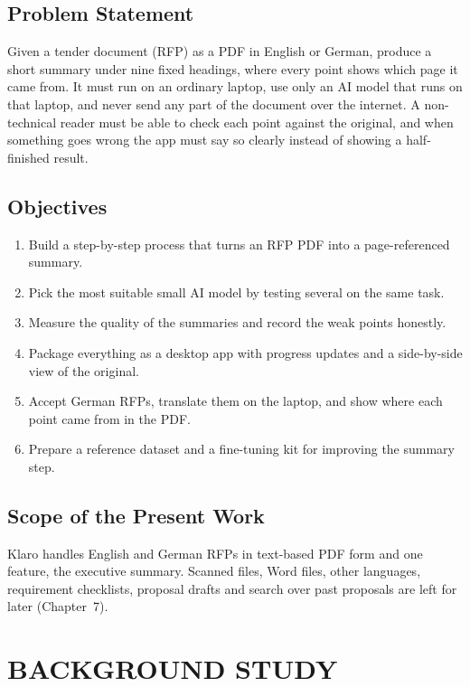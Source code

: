 \documentclass[11pt,a4paper,oneside]{report}
\newcommand{\nonum}{}%
\begin{document}
\section{Problem Statement}
Given a tender document (RFP) as a PDF in English or German, produce a short summary under nine fixed
headings, where every point shows which page it came from. It must run on an ordinary laptop, use only
an AI model that runs on that laptop, and never send any part of the document over the internet. A
non-technical reader must be able to check each point against the original, and when something goes
wrong the app must say so clearly instead of showing a half-finished result.

\section{Objectives}
\begin{enumerate}
\item Build a step-by-step process that turns an RFP PDF into a page-referenced summary.
\item Pick the most suitable small AI model by testing several on the same task.
\item Measure the quality of the summaries and record the weak points honestly.
\item Package everything as a desktop app with progress updates and a side-by-side view of the original.
\item Accept German RFPs, translate them on the laptop, and show where each point came from in the PDF.
\item Prepare a reference dataset and a fine-tuning kit for improving the summary step.
\end{enumerate}

\section{Scope of the Present Work}
Klaro handles English and German RFPs in text-based PDF form and one feature, the executive summary.
Scanned files, Word files, other languages, requirement checklists, proposal drafts and search over
past proposals are left for later (Chapter~7).

\chapter{BACKGROUND STUDY}\nonum
\end{document}
